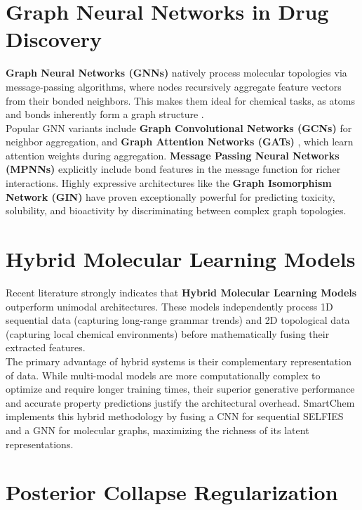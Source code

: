 \documentclass[12pt,a4paper]{report}
\begin{document}
\section{Graph Neural Networks in Drug Discovery}

\textbf{Graph Neural Networks (GNNs)} natively process molecular topologies via message-passing algorithms, where nodes recursively aggregate feature vectors from their bonded neighbors. This makes them ideal for chemical tasks, as atoms and bonds inherently form a graph structure \cite{gilmer2017, kipf2017}.\\

Popular GNN variants include \textbf{Graph Convolutional Networks (GCNs)} \cite{kipf2017} for neighbor aggregation, and \textbf{Graph Attention Networks (GATs)} \cite{velickovic2018}, which learn attention weights during aggregation. \textbf{Message Passing Neural Networks (MPNNs)} \cite{gilmer2017} explicitly include bond features in the message function for richer interactions. Highly expressive architectures like the \textbf{Graph Isomorphism Network (GIN)} \cite{xu2019} have proven exceptionally powerful for predicting toxicity, solubility, and bioactivity by discriminating between complex graph topologies.

\section{Hybrid Molecular Learning Models}

Recent literature strongly indicates that \textbf{Hybrid Molecular Learning Models} outperform unimodal architectures. These models independently process 1D sequential data (capturing long-range grammar trends) and 2D topological data (capturing local chemical environments) before mathematically fusing their extracted features.\\

The primary advantage of hybrid systems is their complementary representation of data. While multi-modal models are more computationally complex to optimize and require longer training times, their superior generative performance and accurate property predictions justify the architectural overhead. SmartChem implements this hybrid methodology by fusing a CNN for sequential SELFIES and a GNN for molecular graphs, maximizing the richness of its latent representations.

\section{Posterior Collapse Regularization}
\end{document}
